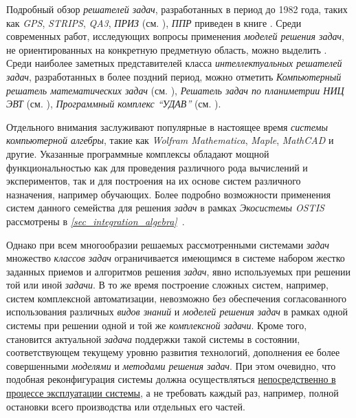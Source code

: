 Подробный обзор \textit{решателей задач}, разработанных в период до 1982 года, таких как \textit{GPS}, \textit{STRIPS}, \textit{QA3}, \textit{ПРИЗ} (см. ), \textit{ППР} приведен в книге . Среди современных работ, исследующих вопросы применения \textit{моделей решения задач}, не ориентированных на конкретную предметную область, можно выделить . Среди наиболее заметных представителей класса \textit{интеллектуальных решателей задач}, разработанных в более поздний период, можно отметить \textit{Компьютерный решатель математических задач} (см. ), \textit{Решатель задач по планиметрии НИЦ ЭВТ} (см. ), \textit{Программный комплекс ``УДАВ''} (см. ). 

Отдельного внимания заслуживают популярные в настоящее время \textit{системы компьютерной алгебры}, такие как \textit{Wolfram Mathematica}, \textit{Maple}, \textit{MathCAD} и другие. Указанные программные комплексы обладают мощной функциональностью как для проведения различного рода вычислений и экспериментов, так и для построения на их основе систем различного назначения, например обучающих. Более подробно возможности применения систем данного семейства для решения \textit{задач} в рамках \textit{Экосистемы OSTIS} рассмотрены в \textit{\ref{sec_integration_algebra}~}.

Однако при всем многообразии решаемых рассмотренными системами \textit{задач} множество \textit{классов задач} ограничивается имеющимся в системе набором жестко заданных приемов и алгоритмов решения \textit{задач}, явно используемых при решении той или иной \textit{задачи}. В то же время построение сложных систем, например, систем комплексной автоматизации, невозможно без обеспечения согласованного использования различных \textit{видов знаний} и \textit{моделей решения задач} в рамках одной системы при решении одной и той же \textit{комплексной задачи}. Кроме того, становится актуальной \textit{задача} поддержки такой системы в состоянии, соответствующем текущему уровню развития технологий, дополнения ее более совершенными \textit{моделями} и \textit{методами решения задач}. При этом очевидно, что подобная реконфигурация системы должна осуществляться \underline{непосредственно в процессе эксплуатации системы}, а не требовать каждый раз, например, полной остановки всего производства или отдельных его частей.

